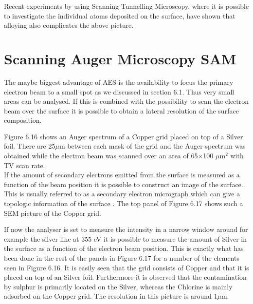           Recent experiments by using  Scanning  Tunnelling  Microscopy,
          where it is possible to  investigate  the  individual  atoms
          deposited on the surface, have shown that alloying   also
          complicates the above picture.

          \section{Scanning Auger Microscopy SAM}


          The maybe biggest advantage of AES is the availability
          to focus the primary electron beam to a  small  spot  as  we
          discussed in section  6.1.  Thus  very  small  areas  can  be
          analysed. If this is combined with the possibility  to  scan
          the electron beam over the surface it is possible to  obtain
          a lateral resolution of the surface  composition.

          Figure 6.16 shows an Auger spectrum of a Copper  grid  placed
          on top of a Silver foil. There are 25$\mu$m  between  each
          mask of the grid and the Auger spectrum was obtained  while
          the electron  beam  was  scanned  over  an  area  of  65$\times$100
          $\mu$m$^{2}$ with TV scan rate.\\




          If the  amount  of  secondary  electrons  emitted  from  the
          surface is measured as a function of the beam  position  it
          is possible to construct an image of the  surface.  This  is
          usually referred to as a secondary electron micrograph which
          can give a topologic information of the surface .  The  top
          panel of Figure 6.17 shows such a SEM picture of the  Copper
          grid.



          If now the analyser is set to measure the  intensity  in  a
          narrow window around for example the silver line at 355 eV it
          is possible to measure the amount of Silver in  the  surface
          as a function of the electron beam position. This is exactly
          what has been done in the rest of the panels in Figure 6.17
          for a number of the elements seen  in  Figure 6.16.  It  is
          easily seen that the grid consists of Copper and that  it  is
          placed on top of an Silver foil. Furthermore it is observed that
          the contamination by sulphur is  primarily  located  on  the
          Silver, whereas the  Chlorine  is  mainly  adsorbed  on  the
          Copper grid.  The  resolution  in  this  picture  is  around
          1$\mu$m.

